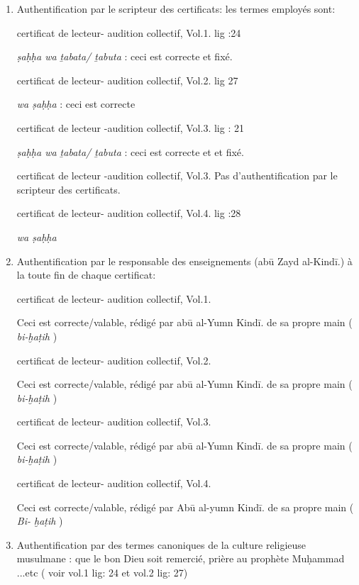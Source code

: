 \documentclass[a4paper,12pt]{report}
\begin{document}
\begin{itemize}
\begin{enumerate}
\begin{enumerate}
\begin{enumerate}
    \item  Authentification par le scripteur des certificats: les termes employés sont: 

  
 certificat de  lecteur- audition collectif,  Vol.1. lig :24

   \textit{ ṣaḥḥa wa ṯabata/ ṯabuta} : ceci est correcte et fixé. 

 certificat de  lecteur- audition collectif,  Vol.2. lig 27

  \textit{wa ṣaḥḥa } : ceci est correcte

 certificat de  lecteur -audition collectif,  Vol.3. lig : 21

  \textit{ ṣaḥḥa wa ṯabata/ ṯabuta} : ceci est correcte et et fixé. 

 certificat de  lecteur -audition collectif,  Vol.3. Pas d'authentification par le scripteur des certificats. 

  certificat de  lecteur- audition collectif,  Vol.4. lig :28

  \textit{wa ṣaḥḥa }


\item  Authentification par le responsable des enseignements (abū  Zayd al-Kindī.)  à la toute fin de chaque certificat:

 certificat de  lecteur- audition collectif,  Vol.1. 

   Ceci est correcte/valable, rédigé par abū   al-Yumn Kindī. de sa propre main ( \textit{bi-ḫaṭih} ) 

 certificat de  lecteur- audition collectif,  Vol.2. 

   Ceci est correcte/valable, rédigé par abū   al-Yumn Kindī. de sa propre main ( \textit{bi-ḫaṭih} ) 


 certificat de  lecteur- audition collectif,  Vol.3. 

   Ceci est correcte/valable, rédigé par abū   al-Yumn Kindī. de sa propre main ( \textit{bi-ḫaṭih} ) 

 certificat de  lecteur- audition collectif,  Vol.4. 

   Ceci est correcte/valable, rédigé par Abū   al-yumn Kindī. de sa propre main ( \textit{Bi- ḫaṭih} ) 


\item Authentification  par des termes canoniques de la culture religieuse musulmane : que le bon Dieu soit remercié, prière au prophète Muḥammad ...etc ( voir vol.1 lig: 24 et vol.2 lig: 27)



\end{enumerate}
\end{enumerate}
\end{enumerate}
\end{itemize}
\end{document}
